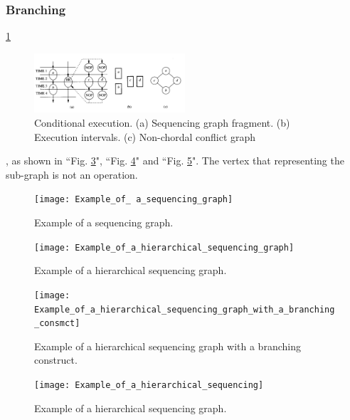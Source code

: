 \subsubsection{Branching}
\ref{fig:Conditional_execution}
\begin{figure}[h]
    \centering
    \includegraphics[width=0.5\textwidth]{Conditional_execution}
    \caption{ Conditional execution. (a) Sequencing graph fragment. (b) Execution intervals. (c) Non-chordal conflict 
graph \cite{b1}}
    \label{fig:Conditional_execution}
\end{figure}



, as shown in ``Fig. \ref{Example_of_a_hierarchical_sequencing_graph}", ``Fig. \ref{Example_of_a_hierarchical_sequencing_graph_with_a_branching_consmct}" and ``Fig. \ref{Example_of_a_hierarchical_sequencing}". The vertex that representing the sub-graph is not an operation.

\begin{figure}[ht]
    \centering
    \texttt{[image: Example\_of\_ a\_sequencing\_graph]}
    \caption{Example of  a sequencing graph. \cite{main}}
    \label{Example_of_ a_sequencing_graph}
\end{figure}

\begin{figure}[ht]
    \centering
    \texttt{[image: Example\_of\_a\_hierarchical\_sequencing\_graph]}
    \caption{Example of a hierarchical sequencing graph. \cite{main}}
    \label{Example_of_a_hierarchical_sequencing_graph}
\end{figure}

\begin{figure}[ht]
    \centering
    \texttt{[image: Example\_of\_a\_hierarchical\_sequencing\_graph\_with\_a\_branching\_consmct]}
    \caption{Example of a hierarchical sequencing graph with a branching construct. \cite{main}}
    \label{Example_of_a_hierarchical_sequencing_graph_with_a_branching_consmct}
\end{figure}

\begin{figure}[ht]
    \centering
    \texttt{[image: Example\_of\_a\_hierarchical\_sequencing]}
    \caption{Example of a hierarchical sequencing graph. \cite{main}}
    \label{Example_of_a_hierarchical_sequencing}
\end{figure}
